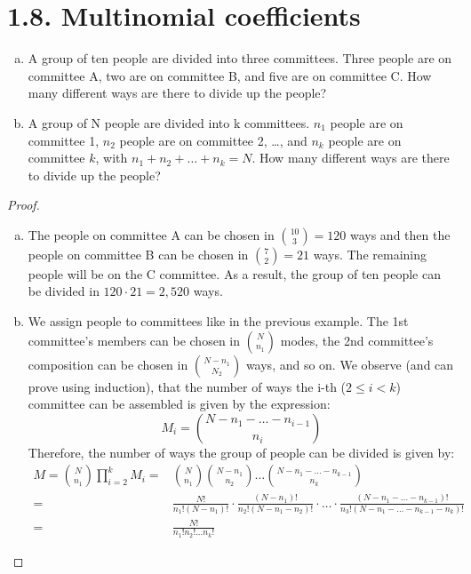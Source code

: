 \section*{1.8. Multinomial coefficients}
\begin{enumerate}[(a)]
    \item A group of ten people are divided into three committees. Three people are on committee
        A, two are on committee B, and five are on committee C. How many different ways are there 
        to divide up the people?

    \item
        A group of N people are divided into k committees. $n_1$ people are on committee 1, $n_2$
        people are on committee 2, \dots, and $n_k$ people are on committee $k$, with 
        $n_1 + n_2 + \dots + n_k = N$. How many different ways are there to divide up the people?
\end{enumerate}

\vspace{1em}

\begin{proof}
    \hfill
    \begin{enumerate}[(a)]
        \item The people on committee A can be chosen in $\binom{10}{3} = 120$ ways and then the people on
            committee B can be chosen in $\binom{7}{2} = 21$ ways. The remaining people will be on the C
            committee. As a result, the group of ten people can be divided in $120 \cdot 21 = 2,520$ ways.
        
        \item We assign people to committees like in the previous example. The 1st committee's members
            can be chosen in $\binom{N}{n_1}$ modes, the 2nd committee's composition can be chosen in 
            $\binom{N - n_1}{N_2}$ ways, and so on. We observe (and can prove using induction), that the
            number of ways the i-th ($2 \leq i < k$) committee can be assembled is given by the expression:
            \[
                M_i = \binom{N - n_1 - \ldots - n_{i - 1}}{n_i}
            \]
            Therefore, the number of ways the group of people can be divided is given by:
            \begin{align*}
                M = \binom{N}{n_1} \prod_{i = 2}^{k}M_i 
                    =& \binom{N}{n_1} \binom{N - n_1}{n_2} \ldots \binom{N - n_1 - \ldots - n_{k - 1}}{n_k} \\
                    =& \frac{N!}{n_1! (N - n_1)!} \cdot \frac{(N - n_1)!}{n_2! (N - n_1 - n_2)!} \cdot \ldots 
                    \cdot \frac{(N - n_1 - \ldots - n_{k - 1})!}{n_3! (N - n_1 - \ldots - n_{k - 1} - n_k)!} \\
                    =& \frac{N!}{n_1!n_2! \ldots n_k!}
            \end{align*}
    \end{enumerate}
\end{proof}

